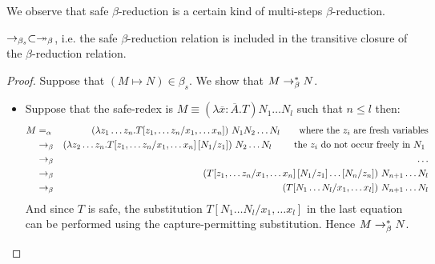 We observe that safe $\beta$-reduction is a certain kind of multi-steps $\beta$-reduction.
\begin{property}
$\rightarrow_{\beta_s} \subset \twoheadrightarrow_\beta$, i.e. the safe
$\beta$-reduction relation is included in the transitive closure of the $\beta$-reduction relation.
\end{property}
\begin{proof}
Suppose that $(M\mapsto N) \in \beta_s$. We show that $M \rightarrow_\beta^* N$.
\begin{itemize}
\item Suppose that the safe-redex is
$M \equiv (\lambda \overline{x} : \overline{A} . T) N_1 \ldots N_l$ such that $n\leq l$ then:
\begin{eqnarray*}
 M &=_\alpha& (\lambda z_1 \ldots z_n .T [z_1,\ldots z_n /x_1,\ldots x_n] ) \ N_1  N_2 \ldots N_l
            \qquad \mbox{where the $z_i$ are fresh variables}  \\
     &\rightarrow_\beta& (\lambda z_2 \ldots z_n .T [z_1,\ldots z_n /x_1,\ldots x_n] \left[ N_1/z_1 \right] ) \ N_2 \ldots N_l
            \qquad \mbox{ the $z_i$ do not occur freely in $N_1$ }\\
    &\rightarrow_\beta& \ldots \\
    &\rightarrow_\beta& (T [z_1,\ldots z_n /x_1,\ldots x_n] \left[ N_1/z_1 \right]  \ldots \left[ N_n/z_n \right])\  N_{n+1} \ldots N_l \\
    &\rightarrow_\beta& (T [N_1\ldots N_l/x_1,\ldots x_l])\ N_{n+1} \ldots N_l
\end{eqnarray*}
And since $T$ is safe, the substitution $T [N_1\ldots N_l/x_1,\ldots x_l]$ in the last equation
can be performed using the capture-permitting substitution. Hence $M \rightarrow_\beta^* N$.


\end{itemize}
\end{proof}
